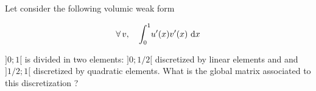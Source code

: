 \bexo

Let consider the following volumic weak form

\begin{equation}
	\forall \,v, \quad  \displaystyle{\int_0^1} u'(x)v'(x) \,\,\textrm{d} x 
\end{equation}

$]0;1[$ is divided in two elements: $]0;1/2[$ discretized by linear elements and and $]1/2;1[$ discretized by quadratic elements. What is the global matrix associated to this discretization ?

\eexo

\solution{

}
